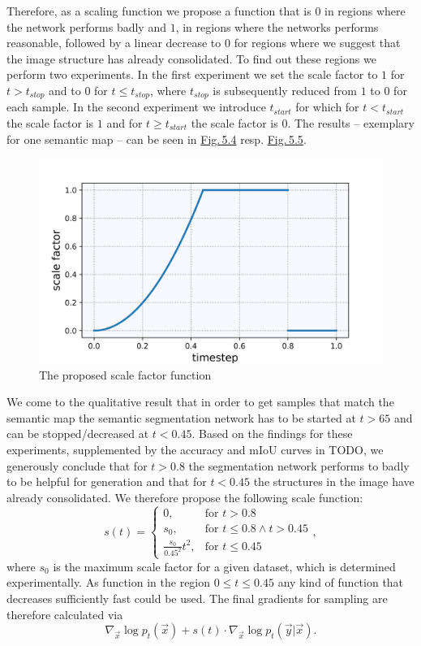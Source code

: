 Therefore, as a scaling function we propose a function that is $0$ in regions where the network performs badly and $1$, in regions where the networks performs reasonable, followed by a linear decrease to $0$ for regions where we suggest that the image structure has already consolidated. To find out these regions we perform two experiments. In the first experiment we set the scale factor to $1$ for $t>t_{stop}$ and to $0$ for $t\leq t_{stop}$, where $t_{stop}$ is subsequently reduced from $1$ to $0$ for each sample. In the second experiment we introduce $t_{start}$ for which for $t<t_{start}$ the scale factor is $1$ and for $t\geq t_{start}$ the scale factor is $0$. The results – exemplary for one semantic map – can be seen in \hyperref[fig:5.4]{Fig.\,5.4} resp. \hyperref[fig:5.5]{Fig.\,5.5}.

%
\begin{figure} \label{fig:5.2}
    \centering
    \includegraphics[width=.65\textwidth]{Chapters/figures/experiments/scale/scale_function.jpg}
    \caption{The proposed scale factor function}
\end{figure}
%
We come to the qualitative result that in order to get samples that match the semantic map the semantic segmentation network has to be started at $t>65$ and can be stopped/decreased at $t<0.45$.  Based on the findings for these experiments, supplemented by the accuracy and mIoU curves in TODO, we generously conclude that for $t>0.8$ the segmentation network performs to badly to be helpful for generation and that for $t<0.45$ the structures in the image have already consolidated. We therefore propose the following scale function:
%
\begin{equation} \label{equ:5.5}
    s(t)=\begin{cases}
        0, &\text{for }t>0.8\\
        s_0, &\text{for }t\leq0.8 \land t>0.45\\
        \frac{s_0}{0.45^2}t^2, &\text{for }t\leq0.45
    \end{cases},
\end{equation}
%
where $s_0$ is the maximum scale factor for a given dataset, which is determined experimentally. As function in the region $0\leq t\leq0.45$ any kind of function that decreases sufficiently fast could be used. The final gradients for sampling are therefore calculated via
%
\begin{equation}
    \nabla_{\vec{x}}\log p_t(\vec{x})+s(t)\cdot\nabla_{\vec{x}}\log p_t(\vec{y}|\vec{x}).
\end{equation}

